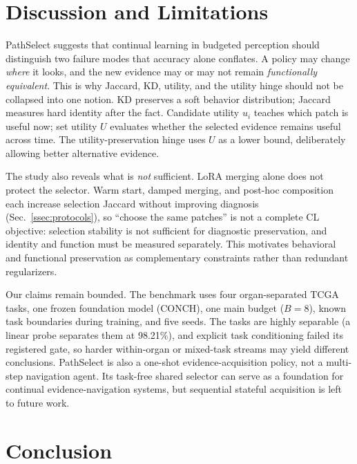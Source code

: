 \documentclass{article}
\begin{document}
\section{Discussion and Limitations}
\label{sec:discussion}

PathSelect suggests that continual learning in budgeted perception should distinguish two failure modes that accuracy alone conflates.
A policy may change \emph{where} it looks, and the new evidence may or may not remain \emph{functionally equivalent}.
This is why Jaccard, KD, utility, and the utility hinge should not be collapsed into one notion.
KD preserves a soft behavior distribution; Jaccard measures hard identity after the fact.
Candidate utility $u_i$ teaches which patch is useful now; set utility $U$ evaluates whether the selected evidence remains useful across time.
The utility-preservation hinge uses $U$ as a lower bound, deliberately allowing better alternative evidence.

The study also reveals what is \emph{not} sufficient.
LoRA merging alone does not protect the selector.
Warm start, damped merging, and post-hoc composition each increase selection Jaccard without improving diagnosis (Sec.~\ref{ssec:protocols}), so ``choose the same patches'' is not a complete CL objective: selection stability is not sufficient for diagnostic preservation, and identity and function must be measured separately.
This motivates behavioral and functional preservation as complementary constraints rather than redundant regularizers.

Our claims remain bounded.
The benchmark uses four organ-separated TCGA tasks, one frozen foundation model (CONCH), one main budget ($B=8$), known task boundaries during training, and five seeds.
The tasks are highly separable (a linear probe separates them at 98.21\%), and explicit task conditioning failed its registered gate, so harder within-organ or mixed-task streams may yield different conclusions.
PathSelect is also a one-shot evidence-acquisition policy, not a multi-step navigation agent.
Its task-free shared selector can serve as a foundation for continual evidence-navigation systems, but sequential stateful acquisition is left to future work.

\section{Conclusion}
\end{document}
